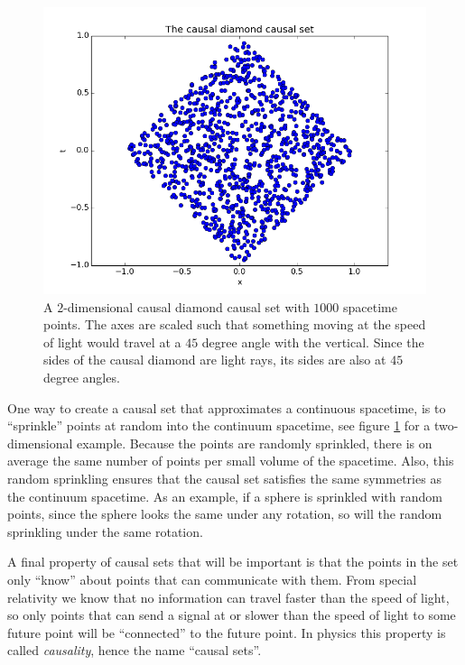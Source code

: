 \documentclass[letterpaper,10pt]{article}
\begin{document}
\begin{figure}
\begin{center}
  \includegraphics[width=5in]{causaldiamond2d.png}
\end{center}
  \caption{
A $2$-dimensional causal diamond causal set with $1000$ spacetime points.  
The axes are scaled such that something moving at the speed of light would travel at a 
$45$ degree angle with the vertical.  Since the sides of the causal diamond are light rays, its sides are also at $45$ degree angles.} \label{causet2d}
\end{figure}

One way to create a causal set that approximates a continuous spacetime, is to ``sprinkle'' points at random into the continuum spacetime, see figure 
\ref{causet2d} for a two-dimensional example.  Because the points are randomly sprinkled, there is on average the same number of points per small volume 
of the spacetime.  Also, this random sprinkling ensures that the causal set satisfies the same symmetries as the continuum spacetime.  As an example, if a 
sphere is sprinkled with random points, since the sphere looks the same under any rotation, so will the random sprinkling under the same rotation.

A final property of causal sets that will be important is that the points in the set only ``know'' about points that can communicate with them.  From 
special relativity we know that no information can travel faster than the speed of light, so only points that can send a signal at or slower than the 
speed of light to some future point will be ``connected'' to the future point.  In physics this property is called {\it causality}, hence the name 
``causal sets''.
\end{document}

